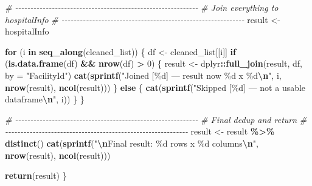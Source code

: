 \documentclass[
]{article}
\newenvironment{Shaded}{\begin{snugshade}}{\end{snugshade}}
\newcommand{\AttributeTok}[1]{\textcolor[rgb]{0.13,0.29,0.53}{#1}}
\newcommand{\CommentTok}[1]{\textcolor[rgb]{0.56,0.35,0.01}{\textit{#1}}}
\newcommand{\ControlFlowTok}[1]{\textcolor[rgb]{0.13,0.29,0.53}{\textbf{#1}}}
\newcommand{\DecValTok}[1]{\textcolor[rgb]{0.00,0.00,0.81}{#1}}
\newcommand{\FunctionTok}[1]{\textcolor[rgb]{0.13,0.29,0.53}{\textbf{#1}}}
\newcommand{\NormalTok}[1]{#1}
\newcommand{\OtherTok}[1]{\textcolor[rgb]{0.56,0.35,0.01}{#1}}
\newcommand{\SpecialCharTok}[1]{\textcolor[rgb]{0.81,0.36,0.00}{\textbf{#1}}}
\newcommand{\StringTok}[1]{\textcolor[rgb]{0.31,0.60,0.02}{#1}}
\begin{document}
\begin{Shaded}
\begin{Highlighting}[]
  \CommentTok{\# {-}{-}{-}{-}{-}{-}{-}{-}{-}{-}{-}{-}{-}{-}{-}{-}{-}{-}{-}{-}{-}{-}{-}{-}{-}{-}{-}{-}{-}{-}{-}{-}{-}{-}{-}{-}{-}{-}{-}{-}{-}{-}{-}{-}{-}{-}{-}{-}{-}{-}{-}{-}{-}{-}{-}{-}{-}{-}{-}{-}}
  \CommentTok{\# Join everything to hospitalInfo}
  \CommentTok{\# {-}{-}{-}{-}{-}{-}{-}{-}{-}{-}{-}{-}{-}{-}{-}{-}{-}{-}{-}{-}{-}{-}{-}{-}{-}{-}{-}{-}{-}{-}{-}{-}{-}{-}{-}{-}{-}{-}{-}{-}{-}{-}{-}{-}{-}{-}{-}{-}{-}{-}{-}{-}{-}{-}{-}{-}{-}{-}{-}{-}}
\NormalTok{  result }\OtherTok{\textless{}{-}}\NormalTok{ hospitalInfo}
    
  \ControlFlowTok{for}\NormalTok{ (i }\ControlFlowTok{in} \FunctionTok{seq\_along}\NormalTok{(cleaned\_list)) \{}
\NormalTok{    df }\OtherTok{\textless{}{-}}\NormalTok{ cleaned\_list[[i]]}
      \ControlFlowTok{if}\NormalTok{ (}\FunctionTok{is.data.frame}\NormalTok{(df) }\SpecialCharTok{\&\&} \FunctionTok{nrow}\NormalTok{(df) }\SpecialCharTok{\textgreater{}} \DecValTok{0}\NormalTok{) \{}
\NormalTok{          result }\OtherTok{\textless{}{-}}\NormalTok{ dplyr}\SpecialCharTok{::}\FunctionTok{full\_join}\NormalTok{(result, df, }\AttributeTok{by =} \StringTok{"FacilityId"}\NormalTok{)}
          \FunctionTok{cat}\NormalTok{(}\FunctionTok{sprintf}\NormalTok{(}\StringTok{"Joined [\%d] — result now \%d x \%d}\SpecialCharTok{\textbackslash{}n}\StringTok{"}\NormalTok{,}
\NormalTok{                      i, }\FunctionTok{nrow}\NormalTok{(result), }\FunctionTok{ncol}\NormalTok{(result)))}
\NormalTok{      \} }\ControlFlowTok{else}\NormalTok{ \{}
          \FunctionTok{cat}\NormalTok{(}\FunctionTok{sprintf}\NormalTok{(}\StringTok{"Skipped [\%d] — not a usable dataframe}\SpecialCharTok{\textbackslash{}n}\StringTok{"}\NormalTok{, i))}
\NormalTok{      \}}
\NormalTok{  \}}
    
  \CommentTok{\# {-}{-}{-}{-}{-}{-}{-}{-}{-}{-}{-}{-}{-}{-}{-}{-}{-}{-}{-}{-}{-}{-}{-}{-}{-}{-}{-}{-}{-}{-}{-}{-}{-}{-}{-}{-}{-}{-}{-}{-}{-}{-}{-}{-}{-}{-}{-}{-}{-}{-}{-}{-}{-}{-}{-}{-}{-}{-}{-}{-}}
  \CommentTok{\# Final dedup and return}
  \CommentTok{\# {-}{-}{-}{-}{-}{-}{-}{-}{-}{-}{-}{-}{-}{-}{-}{-}{-}{-}{-}{-}{-}{-}{-}{-}{-}{-}{-}{-}{-}{-}{-}{-}{-}{-}{-}{-}{-}{-}{-}{-}{-}{-}{-}{-}{-}{-}{-}{-}{-}{-}{-}{-}{-}{-}{-}{-}{-}{-}{-}{-}}
\NormalTok{  result }\OtherTok{\textless{}{-}}\NormalTok{ result }\SpecialCharTok{\%\textgreater{}\%} \FunctionTok{distinct}\NormalTok{()}
  \FunctionTok{cat}\NormalTok{(}\FunctionTok{sprintf}\NormalTok{(}\StringTok{"}\SpecialCharTok{\textbackslash{}n}\StringTok{Final result: \%d rows x \%d columns}\SpecialCharTok{\textbackslash{}n}\StringTok{"}\NormalTok{, }\FunctionTok{nrow}\NormalTok{(result), }\FunctionTok{ncol}\NormalTok{(result)))}
    
  \FunctionTok{return}\NormalTok{(result)}
\NormalTok{\}}
\end{Highlighting}
\end{Shaded}
\end{document}
